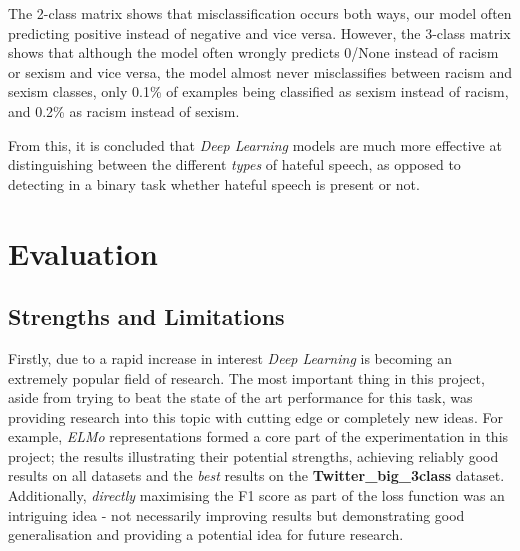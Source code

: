 \documentclass[12pt,a4paper]{article}
\begin{document}
The 2-class matrix shows that misclassification occurs both ways, our model often predicting positive instead of negative and vice versa. However, the 3-class matrix shows that although the model often wrongly predicts 0/None instead of racism or sexism and vice versa, the model almost never misclassifies between racism and sexism classes, only 0.1\% of examples being classified as sexism instead of racism, and 0.2\% as racism instead of sexism.

From this, it is concluded that \textit{Deep Learning} models are much more effective at distinguishing between the different \textit{types} of hateful speech, as opposed to detecting in a binary task whether hateful speech is present or not.


\section{Evaluation}

\subsection{Strengths and Limitations}
Firstly, due to a rapid increase in interest \textit{Deep Learning} is becoming an extremely popular field of research. The most important thing in this project, aside from trying to beat the state of the art performance for this task, was providing research into this topic with cutting edge or completely new ideas. For example, \textit{ELMo} representations formed a core part of the experimentation in this project; the results illustrating their potential strengths, achieving reliably good results on all datasets and the \textit{best} results on the \textbf{Twitter\_big\_3class} dataset. Additionally, \textit{directly} maximising the F1 score as part of the loss function was an intriguing idea - not necessarily improving results but demonstrating good generalisation and providing a potential idea for future research.
\end{document}
